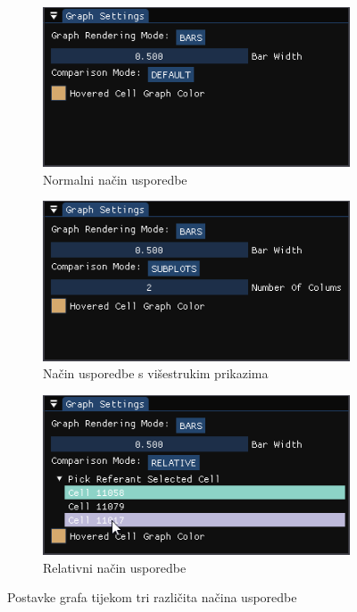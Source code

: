 \documentclass[times, utf8, diplomski]{fer}
\begin{document}
\begin{figure} [H]
     \centering
     \begin{subfigure}[h]{0.48\textwidth}
         \centering
         \includegraphics[width=\textwidth]{graph_settings_default.png}
         \caption{Normalni način usporedbe}
         \label{fig:graph-settings-normal-mode}
     \end{subfigure}
     \hfill
     \begin{subfigure}[h]{0.48\textwidth}
         \centering
         \includegraphics[width=\textwidth]{graph_settings_subplots.png}
         \caption{Način usporedbe s višestrukim prikazima}
         \label{fig:graph-settings-limits-mode}
     \end{subfigure}
     \hfill
     \begin{subfigure}[h]{0.48\textwidth}
         \centering
         \includegraphics[width=\textwidth]{graph_settings_relative.png}
         \caption{Relativni način usporedbe}
         \label{fig:graph-settings-limits-mode}
     \end{subfigure}
     \caption{Postavke grafa tijekom tri različita načina usporedbe}
     \label{fig:graph-settings-3-modes}
\end{figure}
\end{document}
